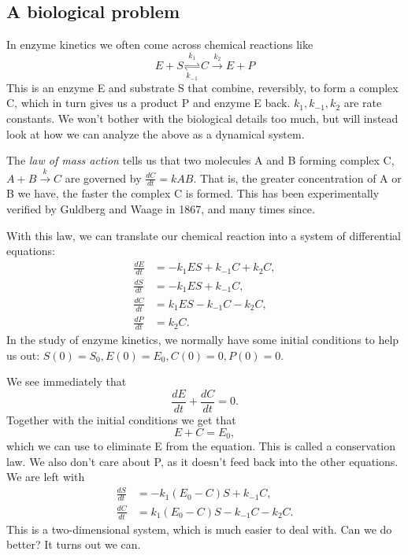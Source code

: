 \documentclass[12pt]{article}
\begin{document}
\subsection{A biological problem}

In enzyme kinetics we often come across chemical reactions like
\begin{equation}
E + S \underset{k_{-1}}{\overset{k_{1}}\rightleftharpoons} C
 \overset{k_2}\longrightarrow E + P
\end{equation}
This is an enzyme E and substrate S that combine, reversibly, to form
a complex C, which in turn gives us a product P and enzyme E back.
$k_1, k_{-1}, k_2$ are rate constants. We won't bother with the
biological details too much, but will instead look at how we can
analyze the above as a dynamical system.

The \textit{law of mass action} tells us that two molecules A and B
forming complex C, $A+B \overset{k}\longrightarrow C$ are governed by
$\frac{dC}{dt} = kAB$. That is, the greater concentration of A or B we
have, the faster the complex C is formed. This has been
experimentally verified by Guldberg and Waage in 1867, and many times
since.

With this law, we can translate our chemical reaction into a system of
differential equations:
\begin{align}
\frac{dE}{dt} &= -k_1ES + k_{-1}C + k_2C, \\
\frac{dS}{dt} &= -k_1ES + k_{-1}C, \\
\frac{dC}{dt} &= k_1ES - k_{-1}C - k_2C, \\
\frac{dP}{dt} &= k_2C.
\end{align}
In the study of enzyme kinetics, we normally have some initial conditions to help
us out: $S(0) = S_0, E(0) = E_0, C(0)=0, P(0)=0$.

We see immediately that
\begin{equation}
\frac{dE}{dt} + \frac{dC}{dt} = 0.
\end{equation}
Together with the initial conditions we get that
\begin{equation}
E + C = E_0,
\end{equation}
which we can use to eliminate E from the equation. This is called a conservation
law.  We also don't care about P, as it doesn't feed back into the other
equations. We are left with
\begin{align}
\frac{dS}{dt} &= -k_1(E_0 - C)S + k_{-1}C, \\
\frac{dC}{dt} &= k_1(E_0 - C)S - k_{-1}C - k_2 C.
\end{align}
This is a two-dimensional system, which is much easier to deal with. Can we do
better? It turns out we can.
\end{document}
